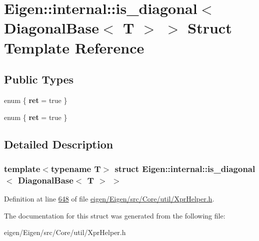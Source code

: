 \hypertarget{struct_eigen_1_1internal_1_1is__diagonal_3_01_diagonal_base_3_01_t_01_4_01_4}{}\section{Eigen\+:\+:internal\+:\+:is\+\_\+diagonal$<$ Diagonal\+Base$<$ T $>$ $>$ Struct Template Reference}
\label{struct_eigen_1_1internal_1_1is__diagonal_3_01_diagonal_base_3_01_t_01_4_01_4}
\subsection*{Public Types}
\begin{DoxyCompactItemize}
\item 
\mbox{\label{struct_eigen_1_1internal_1_1is__diagonal_3_01_diagonal_base_3_01_t_01_4_01_4_a6a8ecce07bbfdaa8d05e9f82fbb082e9}} 
enum \{ {\bfseries ret} = true
 \}
\item 
\mbox{\label{struct_eigen_1_1internal_1_1is__diagonal_3_01_diagonal_base_3_01_t_01_4_01_4_a7f35ee4972b633b40bbe525038fc21e1}} 
enum \{ {\bfseries ret} = true
 \}
\end{DoxyCompactItemize}


\subsection{Detailed Description}
\subsubsection*{template$<$typename T$>$\newline
struct Eigen\+::internal\+::is\+\_\+diagonal$<$ Diagonal\+Base$<$ T $>$ $>$}



Definition at line \hyperlink{eigen_2_eigen_2src_2_core_2util_2_xpr_helper_8h_source_l00648}{648} of file \hyperlink{eigen_2_eigen_2src_2_core_2util_2_xpr_helper_8h_source}{eigen/\+Eigen/src/\+Core/util/\+Xpr\+Helper.\+h}.



The documentation for this struct was generated from the following file\+:\begin{DoxyCompactItemize}
\item 
eigen/\+Eigen/src/\+Core/util/\+Xpr\+Helper.\+h\end{DoxyCompactItemize}
